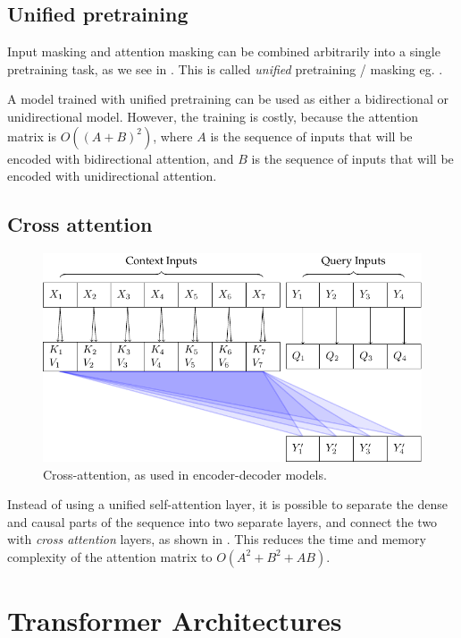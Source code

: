 \subsection{Unified pretraining}
\label{ss:unified}

Input masking and attention masking can be combined arbitrarily into a single pretraining task, as we see in . This is called \textit{unified} pretraining / masking eg. \cite{unilm,t5}.

A model trained with unified pretraining can be used as either a bidirectional or unidirectional model. However, the training is costly, because the attention matrix is $O((A+B)^2)$, where $A$ is the sequence of inputs that will be encoded with bidirectional attention, and $B$ is the sequence of inputs that will be encoded with unidirectional attention.

\subsection{Cross attention}
\label{ss:cross-attn}

\begin{figure}
    \centering
    \includegraphics[]{figures/attn-2-cross.pdf}
    \caption[Cross-attention]{Cross-attention, as used in encoder-decoder models.}
    \hrulefill
    \label{fig:cross-attn}
\end{figure}

Instead of using a unified self-attention layer, it is possible to separate the dense and causal parts of the sequence into two separate layers, and connect the two with \textit{cross attention} layers, as shown in . This reduces the time and memory complexity of the attention matrix to $O(A^2 + B^2 + AB)$.

\section{Transformer Architectures}

